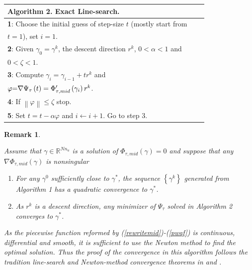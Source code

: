 \documentclass[journal]{IEEEtran}
\newtheorem{remark}{Remark}
\begin{document}
\begin{table}[h]
	\begin{center}
		\begin{tabular}{lcl}
			\toprule
			\textbf{Algorithm 2}. Exact Line-search.\\
			\midrule
			\textbf{1}: Choose the initial guess of step-size $t$ (mostly start from\\ $t=1$), set $i = 1$. \\
			\textbf{2}: Given $\gamma_0 = \gamma^k$, the descent direction $r^k$, $0< \alpha <1$ and\\ $0< \zeta <1$.\\
			\textbf{3}: Compute $\gamma_i=\gamma_{i-1}+tr^k$ and \\$\varphi {\rm{ = }}\nabla {\Psi _\tau }\left( t \right) = {\Phi ' _{\tau ,mid}}\left( {{\gamma _i}} \right){r^k}$.\\
			\textbf{4}: If $\left\| \varphi  \right\|   \le \zeta $ stop.\\
			\textbf{5}: Set $t = t - \alpha \varphi $ and $i \leftarrow i + 1$. Go to step 3.\\
			\toprule
		\end{tabular}
	\end{center}
\end{table}

\begin{remark}\label{rmk2}
	
	Assume that $\gamma  \in {\mathbb{R}^{Nn_u}} $ is a solution of ${\Phi _{\tau,mid} }\left( \gamma  \right) = 0$ and suppose that any $\nabla {\Phi _{\tau ,mid}}\left( \gamma  \right)$ is nonsingular

	\begin{enumerate}		
		\item For any ${\gamma ^0}$ sufficiently close to ${\gamma ^*}$, the sequence $\left\{ {{\gamma ^k}} \right\}$ generated from Algorithm 1 has a quadratic convergence to ${\gamma ^*}$.
		\item As ${r ^k}$ is a descent direction, any minimizer of ${\Psi _\tau }$ solved in Algorithm 2 converges to ${\gamma ^*}$.
	\end{enumerate}
	
	As the piecewise function reformed by (\ref{rewritemid})-(\ref{pwaf}) is continuous, differential and smooth, it is sufficient to use the Newton method to find the optimal solution. Thus the proof of the convergence in this algorithm follows the tradition line-search and Newton-method convergence theorems in \cite{leong2013convergence} and \cite{facchinei2007finite}.
	
\end{remark}
\end{document}
